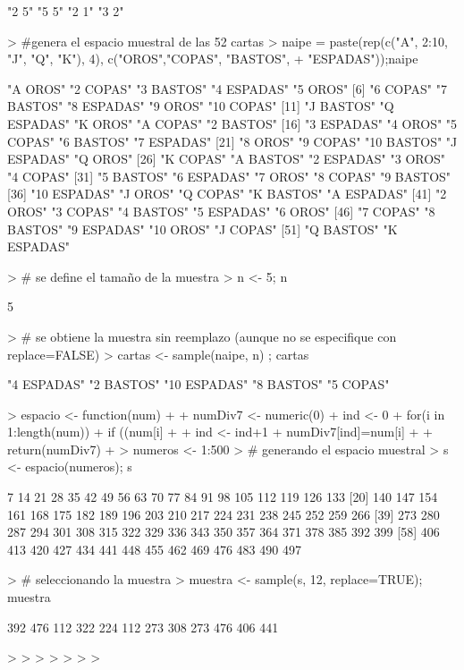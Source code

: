 \documentclass{article}
\begin{document}
\begin{Schunk}
\begin{Soutput}
[1] "2 5" "5 5" "2 1" "3 2"
\end{Soutput}
\begin{Sinput}
> #genera el espacio muestral de las 52 cartas
> naipe = paste(rep(c("A", 2:10, "J", "Q", "K"), 4), c("OROS","COPAS", "BASTOS",
+ "ESPADAS"));naipe
\end{Sinput}
\begin{Soutput}
 [1] "A OROS"     "2 COPAS"    "3 BASTOS"   "4 ESPADAS"  "5 OROS"    
 [6] "6 COPAS"    "7 BASTOS"   "8 ESPADAS"  "9 OROS"     "10 COPAS"  
[11] "J BASTOS"   "Q ESPADAS"  "K OROS"     "A COPAS"    "2 BASTOS"  
[16] "3 ESPADAS"  "4 OROS"     "5 COPAS"    "6 BASTOS"   "7 ESPADAS" 
[21] "8 OROS"     "9 COPAS"    "10 BASTOS"  "J ESPADAS"  "Q OROS"    
[26] "K COPAS"    "A BASTOS"   "2 ESPADAS"  "3 OROS"     "4 COPAS"   
[31] "5 BASTOS"   "6 ESPADAS"  "7 OROS"     "8 COPAS"    "9 BASTOS"  
[36] "10 ESPADAS" "J OROS"     "Q COPAS"    "K BASTOS"   "A ESPADAS" 
[41] "2 OROS"     "3 COPAS"    "4 BASTOS"   "5 ESPADAS"  "6 OROS"    
[46] "7 COPAS"    "8 BASTOS"   "9 ESPADAS"  "10 OROS"    "J COPAS"   
[51] "Q BASTOS"   "K ESPADAS" 
\end{Soutput}
\begin{Sinput}
> # se define el tamaño de la muestra
> n <- 5; n
\end{Sinput}
\begin{Soutput}
[1] 5
\end{Soutput}
\begin{Sinput}
> # se obtiene la muestra sin reemplazo (aunque no se especifique con replace=FALSE)
> cartas <- sample(naipe, n) ; cartas
\end{Sinput}
\begin{Soutput}
[1] "4 ESPADAS"  "2 BASTOS"   "10 ESPADAS" "8 BASTOS"   "5 COPAS"   
\end{Soutput}
\begin{Sinput}
> espacio <- function(num)
+ {
+ numDiv7 <- numeric(0)
+ ind <- 0
+ for(i in 1:length(num))
+ if ((num[i] %% 7)==0)
+ {
+ ind <- ind+1
+ numDiv7[ind]=num[i]
+ }
+ return(numDiv7)
+ }
> numeros <- 1:500
> # generando el espacio muestral
> s <- espacio(numeros); s
\end{Sinput}
\begin{Soutput}
 [1]   7  14  21  28  35  42  49  56  63  70  77  84  91  98 105 112 119 126 133
[20] 140 147 154 161 168 175 182 189 196 203 210 217 224 231 238 245 252 259 266
[39] 273 280 287 294 301 308 315 322 329 336 343 350 357 364 371 378 385 392 399
[58] 406 413 420 427 434 441 448 455 462 469 476 483 490 497
\end{Soutput}
\begin{Sinput}
> # seleccionando la muestra
> muestra <- sample(s, 12, replace=TRUE); muestra
\end{Sinput}
\begin{Soutput}
 [1] 392 476 112 322 224 112 273 308 273 476 406 441
\end{Soutput}
\begin{Sinput}
> 
> 
> 
> 
> 
> 
> 
\end{Sinput}
\end{Schunk}
\end{document}
